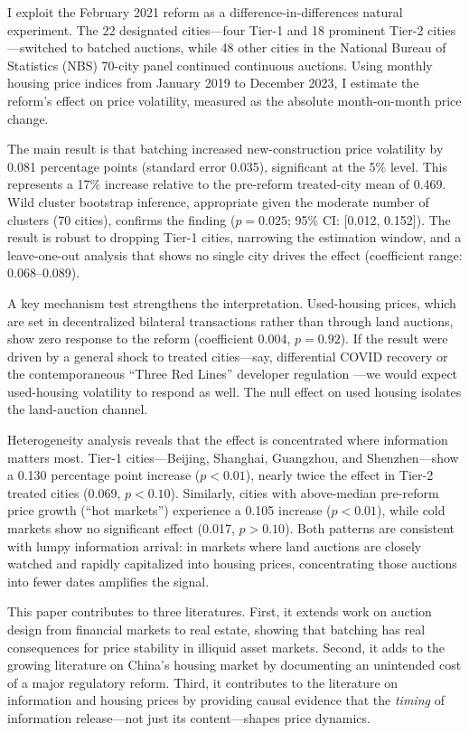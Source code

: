 \documentclass[12pt]{article}
\begin{document}
I exploit the February 2021 reform as a difference-in-differences natural experiment. The 22 designated cities---four Tier-1 and 18 prominent Tier-2 cities---switched to batched auctions, while 48 other cities in the National Bureau of Statistics (NBS) 70-city panel continued continuous auctions. Using monthly housing price indices from January 2019 to December 2023, I estimate the reform's effect on price volatility, measured as the absolute month-on-month price change.

The main result is that batching increased new-construction price volatility by 0.081 percentage points (standard error 0.035), significant at the 5\% level. This represents a 17\% increase relative to the pre-reform treated-city mean of 0.469. Wild cluster bootstrap inference, appropriate given the moderate number of clusters (70 cities), confirms the finding ($p = 0.025$; 95\% CI: [0.012, 0.152]). The result is robust to dropping Tier-1 cities, narrowing the estimation window, and a leave-one-out analysis that shows no single city drives the effect (coefficient range: 0.068--0.089).

A key mechanism test strengthens the interpretation. Used-housing prices, which are set in decentralized bilateral transactions rather than through land auctions, show zero response to the reform (coefficient 0.004, $p = 0.92$). If the result were driven by a general shock to treated cities---say, differential COVID recovery or the contemporaneous ``Three Red Lines'' developer regulation \citep{liu2022three}---we would expect used-housing volatility to respond as well. The null effect on used housing isolates the land-auction channel.

Heterogeneity analysis reveals that the effect is concentrated where information matters most. Tier-1 cities---Beijing, Shanghai, Guangzhou, and Shenzhen---show a 0.130 percentage point increase ($p < 0.01$), nearly twice the effect in Tier-2 treated cities (0.069, $p < 0.10$). Similarly, cities with above-median pre-reform price growth (``hot markets'') experience a 0.105 increase ($p < 0.01$), while cold markets show no significant effect (0.017, $p > 0.10$). Both patterns are consistent with lumpy information arrival: in markets where land auctions are closely watched and rapidly capitalized into housing prices, concentrating those auctions into fewer dates amplifies the signal.

This paper contributes to three literatures. First, it extends work on auction design \citep{klemperer2004auctions, budish2015high} from financial markets to real estate, showing that batching has real consequences for price stability in illiquid asset markets. Second, it adds to the growing literature on China's housing market \citep{fang2016demystifying, glaeser2017housing, wu2020housing} by documenting an unintended cost of a major regulatory reform. Third, it contributes to the literature on information and housing prices \citep{han2017effects, case2003real} by providing causal evidence that the \textit{timing} of information release---not just its content---shapes price dynamics.
\end{document}
